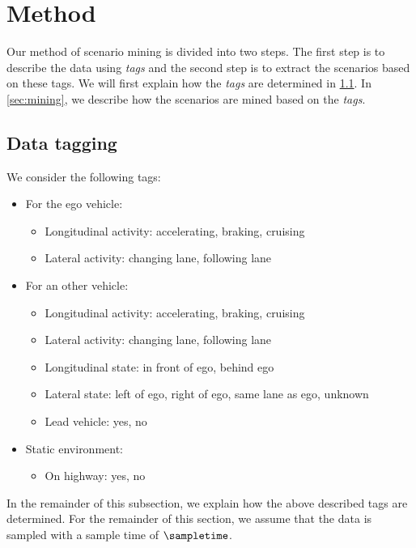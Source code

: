 \section{Method}
\label{sec:method}

Our method of scenario mining is divided into two steps. The first step is to describe the data using \emph{tags} and the second step is to extract the scenarios based on these tags. We will first explain how the \emph{tags} are determined in \cref{sec:data tagging}. In \cref{sec:mining}, we describe how the scenarios are mined based on the \emph{tags}.



\subsection{Data tagging}
\label{sec:data tagging}


We consider the following tags:
\begin{itemize}
	\item For the ego vehicle:
	\begin{itemize}
		\item Longitudinal activity: accelerating, braking, cruising
		\item Lateral activity: changing lane, following lane
	\end{itemize}
	\item For an other vehicle:
	\begin{itemize}
		\item Longitudinal activity: accelerating, braking, cruising
		\item Lateral activity: changing lane, following lane
		\item Longitudinal state: in front of ego, behind ego
		\item Lateral state: left of ego, right of ego, same lane as ego, unknown
		\item Lead vehicle: yes, no
	\end{itemize}
	\item Static environment:
	\begin{itemize}
		\item On highway: yes, no
	\end{itemize}
\end{itemize}


In the remainder of this subsection, we explain how the above described tags are determined. 
For the remainder of this section, we assume that the data is sampled with a sample time of $\sampletime$.



